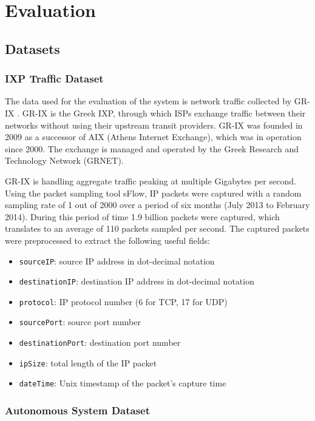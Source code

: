 \chapter{Evaluation}\label{chapter:evaluation}

\section{Datasets}

\subsection{IXP Traffic Dataset}

The data used for the evaluation of the system is network traffic collected by GR-IX \cite{gr-ix}. GR-IX is the Greek IXP, through which ISPs exchange traffic between their networks without using their upstream transit providers. GR-IX was founded in 2009 as a successor of AIX (Athens Internet Exchange), which was in operation since 2000. The exchange is managed and operated by the Greek Research and Technology Network (GRNET).

GR-IX is handling aggregate traffic peaking at multiple Gigabytes per second. Using the packet sampling tool sFlow, IP packets were captured with a random sampling rate of 1 out of 2000 over a period of six months (July 2013 to February 2014). During this period of time 1.9 billion packets were captured, which translates to an average of 110 packets sampled per second. The captured packets were preprocessed to extract the following useful fields:
\begin{itemize}
\item \texttt{sourceIP}: source IP address in dot-decimal notation
\item \texttt{destinationIP}: destination IP address in dot-decimal notation
\item \texttt{protocol}: IP protocol number (6 for TCP, 17 for UDP)
\item \texttt{sourcePort}: source port number
\item \texttt{destinationPort}: destination port number
\item \texttt{ipSize}: total length of the IP packet
\item \texttt{dateTime}: Unix timestamp of the packet's capture time
\end{itemize}

\subsection{Autonomous System Dataset}\label{subsection:benchmarks_as_dataset}

